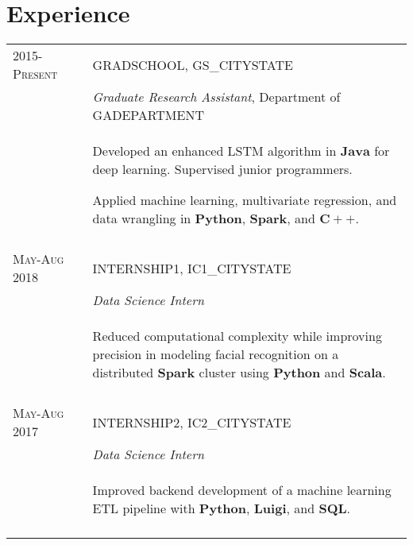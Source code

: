 \documentclass[a4paper,10pt]{article}
\begin{document}
\section{Experience}
\begin{supertabular}{l p{0.55cm} p{13.9cm}}
	\textsc{2015-Present}				&& \textsc{GRADSCHOOL}, GS_CITYSTATE \\
	\small\textsc{}							&& \small	\emph{Graduate Research Assistant}, \small Department of GADEPARTMENT \\
															&& \begin{enumerate*}[label =$\circ$,itemjoin={\newline}]
																	\item \footnotesize Developed an enhanced LSTM algorithm in $\mathbf{Java}$ for deep learning. Supervised junior programmers.
																	\item \footnotesize Applied machine learning, multivariate regression, and data wrangling in $\mathbf{Python}$, $\mathbf{Spark}$, and $\mathbf{C++}$.
																	\end{enumerate*} \vspace{2mm} \\

	 \\

	\textsc{May-Aug 2018}	&& \textsc{INTERNSHIP1}, IC1_CITYSTATE \\
												&& \small	\emph{Data Science Intern} \\
												&& \begin{enumerate*}[label =$\circ$, itemjoin={\newline}]
														\item \footnotesize Reduced computational complexity while improving precision in modeling facial recognition on a distributed $\mathbf{Spark}$ cluster using $\mathbf{Python}$ and $\mathbf{Scala}$.														\end{enumerate*} \\
	 \\
	



	\textsc{May-Aug 2017}	&& \textsc{INTERNSHIP2}, IC2_CITYSTATE \\
												&& \small	\emph{Data Science Intern} \\
												&& \begin{enumerate*}[label =$\circ$, itemjoin={\newline}]
														\item \footnotesize Improved backend development of a machine learning ETL pipeline with $\mathbf{Python}$, $\mathbf{Luigi}$, and $\mathbf{SQL}$.														\end{enumerate*} \\
	 \\
	



\end{supertabular}
\end{document}
